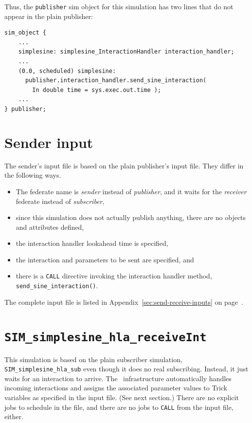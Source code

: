 Thus, the {\tt publisher} sim object for this simulation has two
lines that do not appear in the plain publisher:

\begin{lstlisting}[numbers=none,caption={Sending interaction handler \sdefine changes},label={list:sending-interaction-handler-sdefine-changed}]
  sim_object {
    ...
    simplesine: simplesine_InteractionHandler interaction_handler;
    ...
    (0.0, scheduled) simplesine:
      publisher.interaction_handler.send_sine_interaction(
        In double time = sys.exec.out.time );
    ...
} publisher;
\end{lstlisting}

\section{Sender input}

The sender's input file is based on the plain publisher's input file.
They differ in the following ways.
\begin{itemize}
\item{
  The federate name is {\em sender} instead of {\em publisher},
  and it waits for the {\em receiver} federate instead of {\em subscriber},
}
\item{
  since this simulation does not actually publish anything,
  there are no objects and attributes defined,
}
\item{
  the interaction handler lookahead time is specified,
}
\item{
  the interaction and parameters to be sent are specified, and
}
\item{
  there is a {\tt CALL} directive invoking the interaction handler
  method, {\tt send\_sine\_interaction()}.
}
\end{itemize}

The complete input file is listed in
Appendix~\ref{sec:send-receive-inputs}
on page~\pageref{sec:complete-sender-input}.

\section{\tt SIM\_simplesine\_hla\_receiveInt}

This simulation is based on the plain subscriber simulation,
{\tt SIM\_simplesine\_hla\_sub} even though it does no real subscribing.
Instead, it just waits for an interaction to arrive.
The \TrickHLA\ infrastructure automatically handles incoming interactions
and assigns the associated parameter values to Trick variables
as specified in the input file. (See next section.)
There are no explicit jobs to schedule in the \sdefine file,
and there are no jobs to {\tt CALL} from the input file, either.

